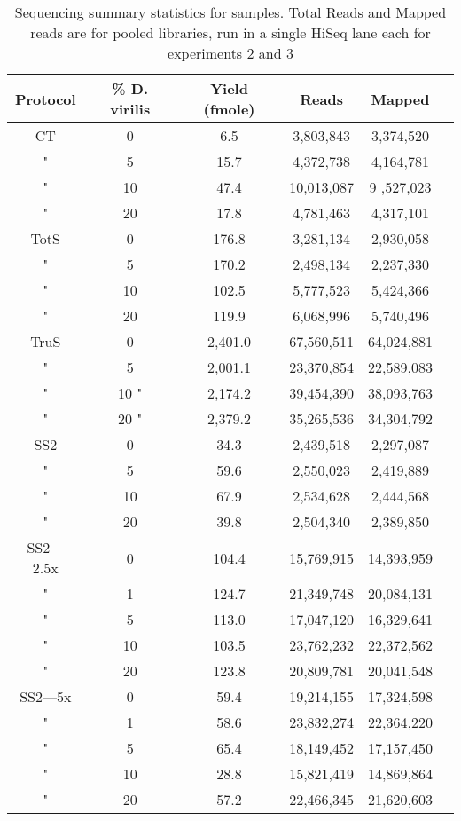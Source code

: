 \begin{table}[htdp]
\begin{center}
\begin{tabular}{|c|c|c|c|c|c|} \hline
Protocol & \%  D. virilis  &  Yield (fmole) & Reads & Mapped \\\hline 
CT & 0  & 6.5  & 3,803,843 & 3,374,520 \\
" &  5 & 15.7  & 4,372,738 & 4,164,781 \\
" & 10 & 47.4  & 10,013,087 &9 ,527,023 \\
" & 20 & 17.8  & 4,781,463 & 4,317,101 \\
TotS & 0  & 176.8  & 3,281,134 & 2,930,058 \\
" &  5  & 170.2  & 2,498,134 & 2,237,330 \\
" & 10  & 102.5  & 5,777,523 & 5,424,366 \\
" & 20  & 119.9  & 6,068,996 &5,740,496 \\
TruS & 0  & 2,401.0  & 67,560,511 & 64,024,881 \\
" &  5  & 2,001.1  & 23,370,854 & 22,589,083 \\
" & 10 " & 2,174.2  & 39,454,390 & 38,093,763 \\
" & 20 " & 2,379.2  & 35,265,536 & 34,304,792 \\
SS2 & 0 & 34.3  & 2,439,518 & 2,297,087 \\
" &  5 & 59.6  & 2,550,023 & 2,419,889 \\
" & 10 & 67.9  & 2,534,628 & 2,444,568 \\
" & 20 & 39.8  & 2,504,340 & 2,389,850 \\
SS2---2.5x & 0 & 104.4  & 15,769,915 & 14,393,959 \\
" &  1 & 124.7  & 21,349,748 & 20,084,131 \\
" &  5 & 113.0  & 17,047,120 & 16,329,641 \\
" & 10 & 103.5  & 23,762,232 & 22,372,562 \\
" & 20 & 123.8  & 20,809,781 & 20,041,548 \\
SS2---5x & 0 & 59.4  & 19,214,155 & 17,324,598 \\
" &  1 & 58.6  & 23,832,274 & 22,364,220 \\
" &  5 & 65.4  & 18,149,452 & 17,157,450 \\
" & 10 & 28.8  & 15,821,419 & 14,869,864 \\
" & 20 & 57.2  & 22,466,345 & 21,620,603 \\
\hline
\end{tabular}
\label{tab:protocols}
\caption{Sequencing summary statistics for samples.  Total Reads
     and Mapped reads are for pooled libraries, run in a single HiSeq lane each
     for experiments 2 and 3}
\end{center}
\end{table}
      
